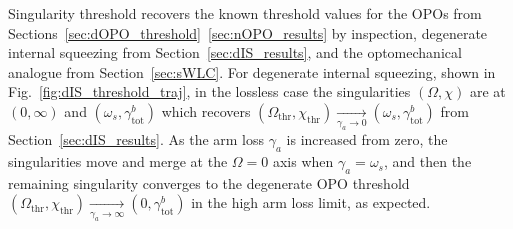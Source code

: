 Singularity threshold recovers the known threshold values for the OPOs from Sections~\ref{sec:dOPO_threshold}~\ref{sec:nOPO_results} by inspection, degenerate internal squeezing from Section~\ref{sec:dIS_results}, and the optomechanical analogue from Section~\ref{sec:sWLC}. %
For degenerate internal squeezing, shown in Fig.~\ref{fig:dIS_threshold_traj}, in the lossless case the singularities $(\Omega,\chi)$ are at $(0,\infty)$ and $(\omega_s,\gamma^b_\text{tot})$ which recovers $(\Omega_\text{thr},\chi_\text{thr})\xrightarrow[\gamma_a\rightarrow0]{}(\omega_s,\gamma^b_\mathrm{tot})$ from Section~\ref{sec:dIS_results}. As the arm loss $\gamma_a$ is increased from zero, the singularities move and merge at the $\Omega=0$ axis when $\gamma_a=\omega_s$, and then the remaining singularity converges to the degenerate OPO threshold $(\Omega_\text{thr},\chi_\text{thr})\xrightarrow[\gamma_a\rightarrow\infty]{}(0,\gamma^b_\mathrm{tot})$ in the high arm loss limit, as expected.
